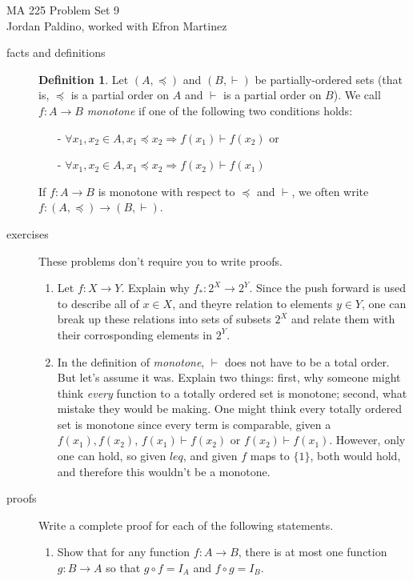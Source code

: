 \documentclass[11pt]{letter}
\theoremstyle{definition}
\newtheorem{definition}{Definition}
\begin{document}
\pagestyle{empty}

{\Large MA 225 Problem Set 9}\\
Jordan Paldino, worked with Efron Martinez

\begin{description}

\item[facts and definitions]
	\begin{definition}
		Let $(A,\preceq)$ and $(B,\vdash)$ be partially-ordered sets (that is, $\preceq$ is a partial order on $A$ and $\vdash$ is a partial order on $B$). We call $f:A\rightarrow B$ {\em monotone} if one of the following two conditions holds: 
			\begin{itemize}
				\item[-] $\forall x_1,x_2\in A, x_1\preceq x_2\Rightarrow f(x_1)\vdash f(x_2)$ or
				\item[-] $\forall x_1,x_2\in A, x_1\preceq x_2\Rightarrow f(x_2)\vdash f(x_1)$
			\end{itemize}
		If $f:A\rightarrow B$ is monotone with respect to $\preceq$ and $\vdash$, we often write $f:(A,\preceq)\rightarrow (B,\vdash)$.
	\end{definition}

\item[exercises] These problems don't require you to write proofs.
	\begin{enumerate}
	\item Let $f:X\rightarrow Y$. Explain why $f_*:2^X\rightarrow 2^Y$. Since the push forward is used to describe all of $x\in X$, and theyre relation to elements $y\in Y$, one can break up these relations into sets of subsets $2^X$ and relate them with their corrosponding elements in $2^Y$.
          
		\item In the definition of {\em monotone}, $\vdash$ does not have to be a total order. But let's assume it was. Explain two things: first, why someone might think {\em every} function to a totally ordered set is monotone; second, what mistake they would be making. One might think every totally ordered set is monotone since every term is comparable, given a $f(x_1),f(x_2)$, $f(x_1)\vdash f(x_2)$ or $f(x_2)\vdash f(x_1)$. However, only one can hold, so given $leq$, and given $f$ maps to $\{1\}$, both would hold, and therefore this wouldn't be a monotone. 
	\end{enumerate}\bigskip

\item[proofs] Write a complete proof for each of the following statements.
	\begin{enumerate}
	\item Show that for any function $f: A\rightarrow B$, there is at most one function $g:B\rightarrow A$ so that $g\circ f=I_A$ and $f\circ g=I_B$. \\
          

\end{enumerate}
\end{description}
\end{document}
